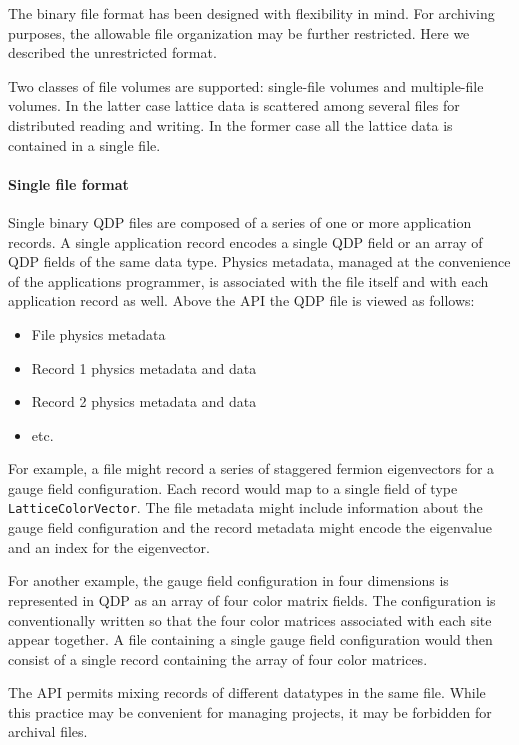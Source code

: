 \documentclass[12pt,letterpaper]{article}
\begin{document}
The binary file format has been designed with flexibility in mind. For
archiving purposes, the allowable file organization may be further
restricted.  Here we described the unrestricted format.

Two classes of file volumes are supported: single-file volumes and
multiple-file volumes.  In the latter case lattice data is scattered
among several files for distributed reading and writing.  In the
former case all the lattice data is contained in a single file.

\paragraph{Single file format}

Single binary QDP files are composed of a series of one or more
application records.  A single application record encodes a single QDP
field or an array of QDP fields of the same data type.  Physics
metadata, managed at the convenience of the applications programmer,
is associated with the file itself and with each application record as
well. Above the API the QDP file is viewed as follows:
%
\begin{itemize}
  \item File physics metadata
  \item Record 1 physics metadata and data
  \item Record 2 physics metadata and data
  \item etc.
\end{itemize}
%
For example, a file might record a series of staggered fermion
eigenvectors for a gauge field configuration.  Each record would map
to a single field of type \verb|LatticeColorVector|.  The file metadata
might include information about the gauge field configuration and the
record metadata might encode the eigenvalue and an index for the
eigenvector.

For another example, the gauge field configuration in four dimensions
is represented in QDP as an array of four color matrix fields.  The
configuration is conventionally written so that the four color matrices
associated with each site appear together.  A file containing a single
gauge field configuration would then consist of a single record
containing the array of four color matrices.

The API permits mixing records of different datatypes in the same
file.  While this practice may be convenient for managing projects, it
may be forbidden for archival files.
\end{document}
